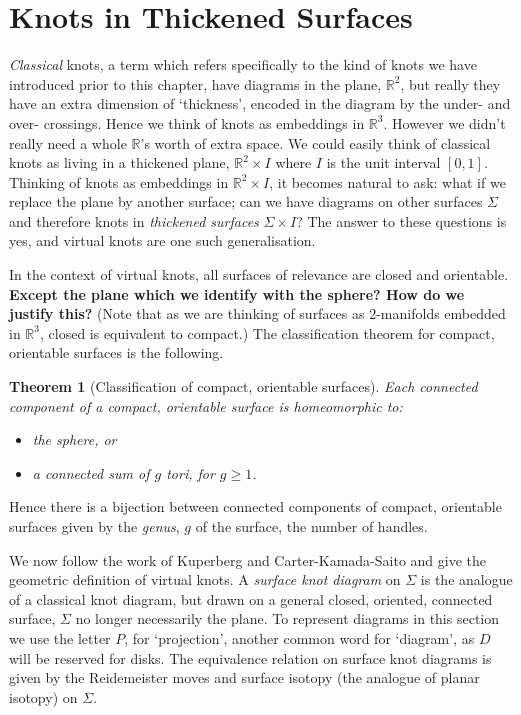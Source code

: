 \documentclass[12pt]{report}
\newcommand{\R}{\mathbb{R}}
\newcommand{\notered}[1]{{\color{Red} \textbf{#1}}}
\newtheorem*{theorem}{Theorem}
\begin{document}
\section{Knots in Thickened Surfaces}

\textit{Classical} knots, a term which refers specifically to the kind of knots we have introduced prior to this chapter, have diagrams in the plane, $\R^{2}$, but really they have an extra dimension of `thickness', encoded in the diagram by the under- and over- crossings. Hence we think of knots as embeddings in $\R^{3}$. However we didn't really need a whole $\R$'s worth of extra space. We could easily think of classical knots as living in a thickened plane, $\R^{2} \times I$ where $I$ is the unit interval $[0, 1]$. Thinking of knots as embeddings in $\R^{2} \times I$, it becomes natural to ask: what if we replace the plane by another surface; can we have diagrams on other surfaces $\Sigma$ and therefore knots in \textit{thickened surfaces} $\Sigma \times I$? The answer to these questions is yes, and virtual knots are one such generalisation.

In the context of virtual knots, all surfaces of relevance are closed and orientable. \notered{Except the plane which we identify with the sphere? How do we justify this?} (Note that as we are thinking of surfaces as $2$-manifolds embedded in $\R^{3}$, closed is equivalent to compact.) The classification theorem for compact, orientable surfaces is the following.

\begin{theorem}[Classification of compact, orientable surfaces]

Each connected component of a compact, orientable surface is homeomorphic to:
\begin{itemize}
\item the sphere, or
\item a connected sum of $g$ tori, for $g \geq 1$.
\end{itemize}
\end{theorem}
Hence there is a bijection between connected components of compact, orientable surfaces given by the \textit{genus}, $g$ of the surface, the number of handles.

We now follow the work of Kuperberg \cite{what-is-a-virtual-link} and Carter-Kamada-Saito \cite{stable-equivalence-virtual-cobordisms} and give the geometric definition of virtual knots. A \textit{surface knot diagram} on $\Sigma$ is the analogue of a classical knot diagram, but drawn on a general closed, oriented, connected surface, $\Sigma$ no longer necessarily the plane. To represent diagrams in this section we use the letter $P$, for `projection', another common word for `diagram', as $D$ will be reserved for disks. The equivalence relation on surface knot diagrams is given by the Reidemeister moves and surface isotopy (the analogue of planar isotopy) on $\Sigma$.
\end{document}
